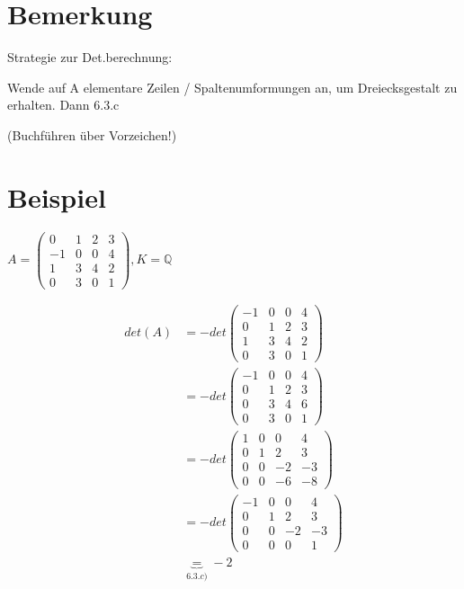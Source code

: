 \documentclass[a4paper, openany]{book}
\begin{document}
        \section{Bemerkung}

        Strategie zur Det.berechnung:

        Wende auf A elementare Zeilen / Spaltenumformungen an, um Dreiecksgestalt zu erhalten. Dann 6.3.c

        \par \medskip

        (Buchführen über Vorzeichen!)

        \section{Beispiel}

        $A = \begin{pmatrix}0 & 1 & 2 & 3 \\ -1 & 0 & 0 & 4 \\  1 & 3 & 4 & 2 \\ 0 & 3 & 0 & 1 \end{pmatrix}, K = \mathbb{Q}$

        \par \medskip

        \begin{align*}
          det(A)  & = - det \begin{pmatrix}-1 & 0 & 0 & 4 \\ 0 & 1 & 2 & 3 \\ 1 & 3 & 4 & 2 \\ 0 & 3 & 0 & 1 \end{pmatrix}  \\
                  & = - det \begin{pmatrix}-1 & 0 & 0 & 4 \\ 0 & 1 & 2 & 3 \\ 0 & 3 & 4 & 6 \\ 0 & 3 & 0 & 1 \end{pmatrix}  \\
                  & = - det \begin{pmatrix}1 & 0 & 0 & 4 \\ 0 & 1 & 2 & 3 \\ 0 & 0 & -2 & -3 \\ 0 & 0 & -6 & -8 \end{pmatrix} \\
                  & = - det \begin{pmatrix}-1 & 0 & 0 & 4 \\ 0 & 1 & 2 & 3 \\ 0 & 0 &-2 & -3 \\ 0 & 0 & 0 & 1 \end{pmatrix} \\
                  & \underbrace{=}_{6.3.c)} -2 
        \end{align*}
\end{document}
